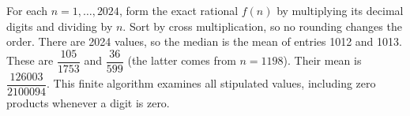 For each $n=1,\ldots,2024$, form the exact rational $f(n)$ by multiplying its decimal digits and dividing by $n$. Sort by cross multiplication, so no rounding changes the order. There are 2024 values, so the median is the mean of entries 1012 and 1013. These are $\dfrac{105}{1753}$ and $\dfrac{36}{599}$ (the latter comes from $n=1198$). Their mean is $\boxed{\dfrac{126003}{2100094}}$. This finite algorithm examines all stipulated values, including zero products whenever a digit is zero.
